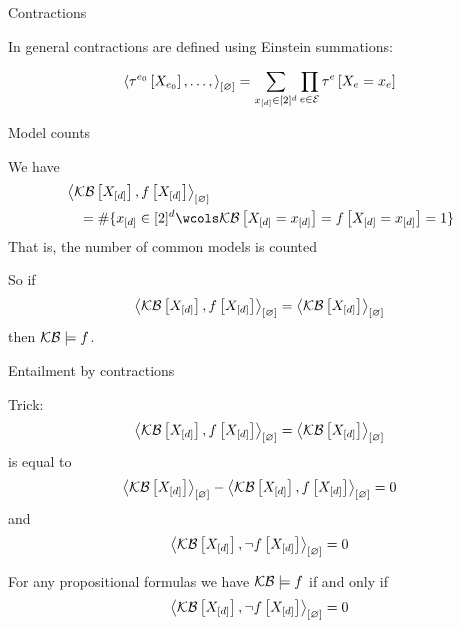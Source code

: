 \documentclass{beamer}
\begin{document}
    \begin{frame}{Contractions}

        In general contractions are defined using Einstein summations:

        \begin{align*}
            \left\langle \tau^{e_0}\left[X_{e_0}\right],\ldots, \right\rangle_{\left[ \varnothing \right]}
            = \sum_{x_{[d]}\in[2]^{d}} 
            \prod_{e\in\mathcal{E}} \tau^{e}\left[X_{e}=x_{e}\right]
        \end{align*}

    \end{frame}

    \begin{frame}{Model counts}

        We have
        \begin{align*}
            &\contraction{\kbwith,\formulawith} \\
            &\quad = \#\{\shortcatindices\in[2]^{\catorder} \wcols \kbat{\indexedshortcatvariables}=\formulaat{\indexedshortcatvariables}=1\}
        \end{align*}
        That is, the number of common models is counted

        So if
        \begin{align*}
            \left\langle \mathcal{KB}\left[X_{[d]}\right],f\left[X_{[d]}\right]\right\rangle_{\left[ \varnothing \right]} = \left\langle \mathcal{KB}\left[X_{[d]}\right]\right\rangle_{\left[ \varnothing \right]}
        \end{align*}
        then $\mathcal{KB}\models f$.



    \end{frame}


    \begin{frame}{Entailment by contractions}

        Trick:
        \begin{align*}
            \left\langle \mathcal{KB}\left[X_{[d]}\right],f\left[X_{[d]}\right]\right\rangle_{\left[ \varnothing \right]} = \left\langle \mathcal{KB}\left[X_{[d]}\right]\right\rangle_{\left[ \varnothing \right]}
        \end{align*}
        is equal to
        \begin{align*}
            \left\langle \mathcal{KB}\left[X_{[d]}\right]\right\rangle_{\left[ \varnothing \right]}-\left\langle \mathcal{KB}\left[X_{[d]}\right],f\left[X_{[d]}\right]\right\rangle_{\left[ \varnothing \right]} = 0
        \end{align*}
        and
        \begin{align*}
            \left\langle \mathcal{KB}\left[X_{[d]}\right],\lnot f\left[X_{[d]}\right]\right\rangle_{\left[ \varnothing \right]} = 0
        \end{align*}

        \begin{block}
            For any propositional formulas we have $\mathcal{KB}\models f$ if and only if
            \begin{align*}
                \left\langle \mathcal{KB}\left[X_{[d]}\right],\lnot f\left[X_{[d]}\right]\right\rangle_{\left[ \varnothing \right]} = 0
            \end{align*}
        \end{block}
    \end{frame}
\end{document}
